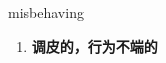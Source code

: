 
\begin{frame}
{\huge misbehaving}
\begin{center}
\begin{enumerate}\Large
  \item \textbf{调皮的，行为不端的}
\end{enumerate}
\end{center}
\end{frame}
